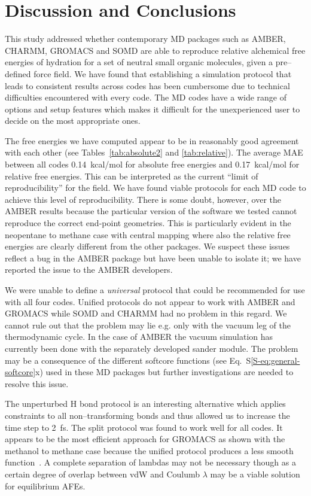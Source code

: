 \documentclass[journal=jctcce,manuscript=article]{achemso}
\begin{document}
\section{Discussion and Conclusions}
\label{sec:discuss}

This study addressed whether contemporary MD packages such as AMBER, CHARMM, GROMACS and SOMD are able to reproduce relative alchemical free energies of hydration for a set of neutral small organic molecules, given a
pre--defined force field.
We have found that establishing a simulation protocol that leads to consistent results across codes has been cumbersome due to technical difficulties encountered with every code.  The MD codes have a wide range of options and setup features which makes it difficult for the unexperienced user to decide on the most
appropriate ones.

The free energies we have computed appear to be in reasonably good agreement with each other (see Tables~\ref{tab:absolute2} and \ref{tab:relative}).  The average MAE between all codes \SI{0.14}{kcal/mol} for absolute free energies and \SI{0.17}{kcal/mol} for relative free energies.  This can be interpreted as the current ``limit of reproducibility'' for the field.  We have found viable protocols for each MD code to achieve
this level of reproducibility.  There is some doubt, however, over the AMBER
results because the particular version of the software we tested  cannot reproduce the correct end-point
geometries.  This is particularly evident in the neopentane to methane case
with central mapping where also the relative free energies are clearly
different from the other packages.  We suspect these issues reflect a bug in
the AMBER package but have been unable to isolate it; we have reported the
issue to the AMBER developers.

We were unable to define  a \emph{universal} protocol that could be recommended for use with all four codes.  Unified protocols do not appear to work with AMBER and GROMACS while SOMD and CHARMM had no problem in this regard.  We cannot rule out that the problem may lie e.g. only with the
vacuum leg of the thermodynamic cycle.  In the case of AMBER the vacuum simulation has currently been done with the separately developed sander module.  The problem may be a consequence of the different softcore functions (see Eq.~S\ref{S-eq:general-softcore}x) used in these MD packages but further investigations are needed to resolve this issue.

The unperturbed H bond protocol is an interesting alternative which
applies constraints to all non--transforming bonds and thus allowed us to increase the time step to \SI{2}{fs}.
 The split protocol was found to work  well for all codes.
  It appears to be the most efficient
approach for GROMACS as shown with the methanol to methane case because the unified protocol produces a less smooth function~\cite{shirts_chapter_2007}.
A complete separation of lambdas may not be necessary though as a certain degree of overlap between vdW and Coulumb $\lambda$ may be a viable
solution~\cite{procacci_fast_2014} for equilibrium AFEs. %
\end{document}
